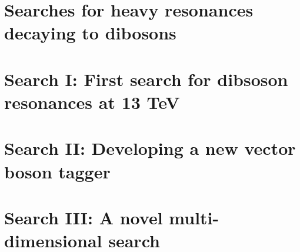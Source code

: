 \section{Searches for heavy resonances decaying to dibosons}
\section{Search I: First search for dibsoson resonances at 13 TeV}
\section{Search II: Developing a new vector boson tagger}
\section{Search III: A novel multi-dimensional search}
